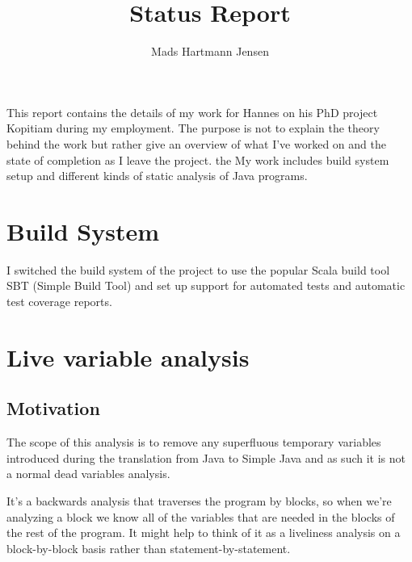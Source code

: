 \documentclass[11pt]{exam}
\title{Status Report}
\author{Mads Hartmann Jensen}
\begin{document}
\maketitle{}

\paragraph{} This report contains the details of my work for Hannes on his PhD project Kopitiam during my employment. The purpose is not to explain the theory behind the work but rather give an overview of what I've worked on and the state of completion as I leave the project. the My work includes build system setup and different kinds of static analysis of Java programs. \newline \newline

\newpage

\tableofcontents

\newpage

\section{Build System}

I switched the build system of the project to use the popular Scala
build tool SBT (Simple Build Tool) and set up support for automated
tests and automatic test coverage reports.

\newpage

\section{Live variable analysis}

\subsection{Motivation}

The scope of this analysis is to remove any superfluous temporary
variables introduced during the translation from Java to Simple Java
and as such it is not a normal dead variables analysis. \newline

It's a backwards analysis that traverses the program by blocks, so
when we're analyzing a block we know all of the variables that are
needed in the blocks of the rest of the program. It might help to think
of it as a liveliness analysis on a block-by-block basis rather than
statement-by-statement.\newline
\end{document}
